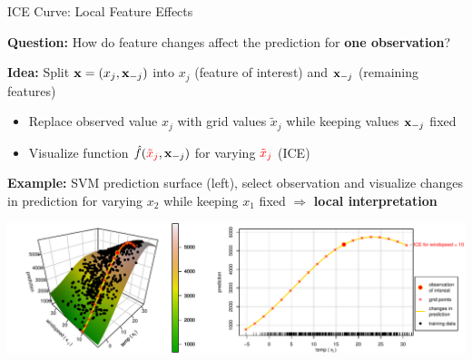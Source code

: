 \documentclass[11pt,compress,t,notes=noshow, aspectratio=169, xcolor=table,dvipsnames]{beamer}
\begin{document}
\begin{frame}{ICE Curve: Local Feature Effects}

\textbf{Question:} How do feature changes affect the prediction for \textbf{one observation}?



\textbf{Idea:} Split $\mathbf{x} = (x_j, \mathbf{x}_{-j})$ into $x_j$ (feature of interest) and $\mathbf{x}_{-j}$ (remaining features) 
\begin{itemize}
    \item Replace observed value $x_j$ with {\color{red} grid values $\tilde x_j$} while keeping values $\mathbf{x}_{-j}$ fixed
    \item Visualize function $\hat{f}({\color{red}\tilde x_j}, \mathbf{x}_{-j})$ for varying ${\color{red}\tilde x_j}$ (ICE)%
\end{itemize}

\pause

\textbf{Example:} SVM prediction surface (left), select observation and visualize changes in prediction for varying $x_2$ while keeping $x_1$ fixed $\Rightarrow$ \textbf{local interpretation}

\vfill
\centering
\includegraphics[width=\textwidth, page = 1]{figure/ice_motivation_bike}

\end{frame}
\end{document}
